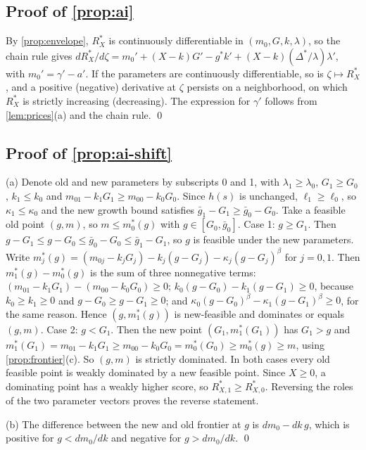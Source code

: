 \subsection*{Proof of \autoref{prop:ai}}

By \autoref{prop:envelope}, $R_X^*$ is continuously differentiable in $(m_0,G,k,\lambda)$, so the chain rule gives $dR_X^*/d\zeta=m_0'+(X-k)G'-g^*k'+(X-k)(\Delta^*/\lambda)\lambda'$, with $m_0'=\gamma'-a'$. If the parameters are continuously differentiable, so is $\zeta\mapsto R_X^*$, and a positive (negative) derivative at $\zeta$ persists on a neighborhood, on which $R_X^*$ is strictly increasing (decreasing). The expression for $\gamma'$ follows from \autoref{lem:prices}(a) and the chain rule. \qed

\subsection*{Proof of \autoref{prop:ai-shift}}

(a) Denote old and new parameters by subscripts 0 and 1, with $\lambda_1\ge\lambda_0$, $G_1\ge G_0$, $k_1\le k_0$ and $m_{01}-k_1G_1\ge m_{00}-k_0G_0$. Since $h(s)$ is unchanged, $\ell_1\ge\ell_0$, so $\kappa_1\le\kappa_0$ and the new growth bound satisfies $\bar g_1-G_1\ge\bar g_0-G_0$. Take a feasible old point $(g,m)$, so $m\le m_0^*(g)$ with $g\in[G_0,\bar g_0]$. Case 1: $g\ge G_1$. Then $g-G_1\le g-G_0\le\bar g_0-G_0\le\bar g_1-G_1$, so $g$ is feasible under the new parameters. Write $m_j^*(g)=(m_{0j}-k_jG_j)-k_j(g-G_j)-\kappa_j(g-G_j)^{\beta}$ for $j=0,1$. Then $m_1^*(g)-m_0^*(g)$ is the sum of three nonnegative terms: $(m_{01}-k_1G_1)-(m_{00}-k_0G_0)\ge 0$; $k_0(g-G_0)-k_1(g-G_1)\ge 0$, because $k_0\ge k_1\ge 0$ and $g-G_0\ge g-G_1\ge 0$; and $\kappa_0(g-G_0)^{\beta}-\kappa_1(g-G_1)^{\beta}\ge 0$, for the same reason. Hence $(g,m_1^*(g))$ is new-feasible and dominates or equals $(g,m)$. Case 2: $g<G_1$. Then the new point $(G_1,m_1^*(G_1))$ has $G_1>g$ and $m_1^*(G_1)=m_{01}-k_1G_1\ge m_{00}-k_0G_0=m_0^*(G_0)\ge m_0^*(g)\ge m$, using \autoref{prop:frontier}(c). So $(g,m)$ is strictly dominated. In both cases every old feasible point is weakly dominated by a new feasible point. Since $X\ge 0$, a dominating point has a weakly higher score, so $R_{X,1}^*\ge R_{X,0}^*$. Reversing the roles of the two parameter vectors proves the reverse statement.

(b) The difference between the new and old frontier at $g$ is $dm_0-dk\,g$, which is positive for $g<dm_0/dk$ and negative for $g>dm_0/dk$. \qed


